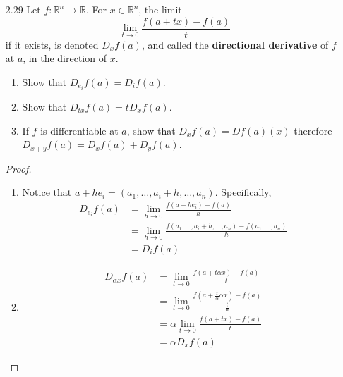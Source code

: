 \begin{enumerate}
\begin{proof}
\begin{enumerate}
        \item Skipping the details, if \( r = (a, g(a), h(a,b)) \) then
        \begin{align*}
            D_1F(a,b) &= D_1f(r) + D_2f(r) g'(a) + D_3f(r)D_1h(a,b) \\
            D_2F(a,b) &= D_3f(r) D_2h(a,b)
        \end{align*}
    \end{enumerate}
    \end{proof}
    
    \item[2.29] Let \( f: \mathbb{R}^n \rightarrow \mathbb{R} \). For \( x \in \mathbb{R}^n \), the limit
    \[
    \lim_{t \rightarrow 0} \frac{f(a+tx)-f(a)}{t}
    \]
    if it exists, is denoted \( D_xf(a) \), and called the \textbf{directional derivative} of \( f \) at \( a \), in the direction of \( x \).
    \begin{enumerate}
        \item Show that \( D_{e_i}f(a) = D_if(a) \).
        \item Show that \( D_{tx}f(a) = tD_xf(a) \).
        \item If \( f \) is differentiable at \( a \), show that \( D_xf(a) = Df(a)(x) \) therefore \( D_{x+y}f(a) = D_xf(a)+D_yf(a) \).
    \end{enumerate}
    
    \begin{proof}
    \begin{enumerate}
        \item Notice that \( a+he_i = (a_1,\ldots,a_i+h,\ldots,a_n) \). Specifically,
        \begin{align*}
            D_{e_i}f(a) &= \lim_{h \rightarrow 0} \frac{f(a+he_i)-f(a)}{h} \\
            &= \lim_{h \rightarrow 0} \frac{f(a_1,\ldots,a_i+h,\ldots,a_n)-f(a_1,\ldots,a_n)}{h} \\
            &= D_if(a)
        \end{align*}
        
        \item 
        \begin{align*}
            D_{\alpha x}f(a) &= \lim_{t \rightarrow 0} \frac{f(a+t\alpha x)-f(a)}{t} \\
            &= \lim_{t \rightarrow 0} \frac{f(a+\frac{t}{\alpha}\alpha x) - f(a)}{\frac{t}{\alpha}} \\
            &= \alpha \lim_{t \rightarrow 0} \frac{f(a+tx)-f(a)}{t} \\
            &= \alpha D_xf(a)
        \end{align*}
        

\end{enumerate}
\end{proof}
\end{enumerate}

